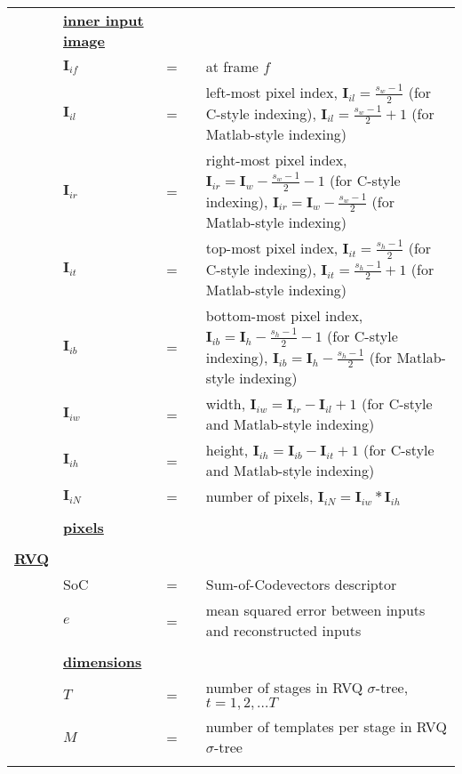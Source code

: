 \documentclass{article}
\begin{document}
\begin{longtable}{llllp{3in}}
&\textbf{\underline{inner input image}}&&&																					\\
&$\mathbf{I}_{if}$    		&=&& at frame $f$																				\\
&$\mathbf{I}_{il}$   		&=&& left-most pixel index, $\mathbf{I}_{il} = \frac{s_w-1}{2}$ (for C-style indexing), $\mathbf{I}_{il} = \frac{s_w-1}{2}+1$ (for Matlab-style indexing)										\\
&$\mathbf{I}_{ir}$   		&=&& right-most pixel index, $\mathbf{I}_{ir} = \mathbf{I}_w - \frac{s_w-1}{2} - 1$ (for C-style indexing), $\mathbf{I}_{ir} = \mathbf{I}_w - \frac{s_w-1}{2}$ (for Matlab-style indexing)	\\
&$\mathbf{I}_{it}$   		&=&& top-most pixel index, $\mathbf{I}_{it} = \frac{s_h-1}{2}$ (for C-style indexing), $\mathbf{I}_{it} = \frac{s_h-1}{2}+1$ (for Matlab-style indexing)										\\
&$\mathbf{I}_{ib}$   		&=&& bottom-most pixel index, $\mathbf{I}_{ib} = \mathbf{I}_h - \frac{s_h-1}{2} - 1$ (for C-style indexing), $\mathbf{I}_{ib} = \mathbf{I}_h - \frac{s_h-1}{2}$ (for Matlab-style indexing)\\
&$\mathbf{I}_{iw}$   		&=&& width, $\mathbf{I}_{iw} = \mathbf{I}_{ir} - \mathbf{I}_{il} + 1$ (for C-style and Matlab-style indexing) 																					\\
&$\mathbf{I}_{ih}$   		&=&& height, $\mathbf{I}_{ih} = \mathbf{I}_{ib} - \mathbf{I}_{it} + 1$ (for C-style and Matlab-style indexing) 																					\\
&$\mathbf{I}_{iN}$   		&=&& number of pixels, $\mathbf{I}_{iN}=\mathbf{I}_{iw}*\mathbf{I}_{ih}$					\\ \\

&\textbf{\underline{pixels}}&&&																								\\ \\




\textbf{\color{red} \underline{RVQ}}&&&&\\
&SoC 						&=&& Sum-of-Codevectors descriptor 																				\\
&$e$						&=&& mean squared error between inputs and reconstructed inputs												\\\\

&\textbf{\underline{dimensions}}&&&																											\\
&$T$    					&=&& number of stages in RVQ $\sigma$-tree, $t=1, 2, \ldots T$ 													\\
&$M$    					&=&& number of templates per stage in RVQ $\sigma$-tree															\\\\


\end{longtable}
\end{document}
